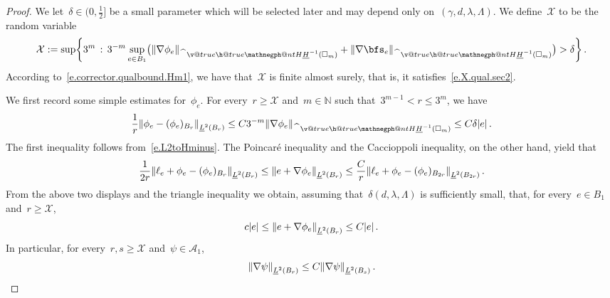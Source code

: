 \documentclass[11pt,twoside]{article} %
\makeatletter
\let\oldsquare\square %
\renewcommand{\square}{\oldsquare}
\numberwithin{equation}{section}
\theoremstyle{definition}
\let\originalleft\left
\let\originalright\right
\renewcommand{\left}{\mathopen{}\mathclose\bgroup\originalleft}
\renewcommand{\right}{\aftergroup\egroup\originalright}
\newcommand*{\N}{\ensuremath{\mathbb{N}}}
\renewcommand*{\hat}{\widehat}
\newcommand{\cu}{\square}
\newcommand{\X}{\mathcal{X}}
\newcommand{\negphantom}{\v@true\h@true\negph@nt}
\newcommand{\negph@nt}{\ifmmode\expandafter\mathpalette 
  \expandafter\mathnegph@nt\else\expandafter\makenegph@nt\fi}
\newcommand{\makenegph@nt}[1]{%
  \setbox\z@\hbox{\color@begingroup#1\color@endgroup}\finnegph@nt}
\newcommand{\finnegph@nt}{%
  \setbox\tw@\null 
  \ifv@ \ht\tw@\ht\z@\dp\tw@\dp\z@\fi \ifh@\wd\tw@-\wd\z@\fi\box\tw@}
\newcommand{\mathnegph@nt}[2]{%
  \setbox\z@\hbox{$\m@th #1{#2}$}\finnegph@nt}
\newcommand{\Hminusul}{\hat{\phantom{H}}\negphantom{H}\underline{H}^{-1}}
\newcommand{\A}{\mathcal{A}}
\makeatother
\begin{document}
\begin{proof}
We let~$\delta\in (0,\tfrac12]$ be a small parameter which will be selected later and may depend only on~$(\gamma,d,\lambda,\Lambda)$. We define~$\X$ to be the random variable
\begin{equation}
\label{e.XC11}
\X:= 
\sup\left\{ 3^m \,:\, 
3^{-m} 
\sup_{e\in B_1}
\bigl(
\left\| \nabla \phi_e \right\|_{\Hminusul(\cu_m)}
+
\left\| \nabla \bfs_e \right\|_{\Hminusul(\cu_m)}
\bigr)
> \delta
\right\}
\,.
\end{equation}
According to~\eqref{e.corrector.qualbound.Hm1}, we have that~$\X$ is finite almost surely, that is, it satisfies~\eqref{e.X.qual.sec2}. 

\smallskip

We first record some simple estimates for~$\phi_e$. 
For every~$r\geq \X$ and~$m \in \N$ such that~$3^{m-1} < r \leq 3^m$, we have 
\begin{align}
\label{e.correbounds.pre}
\frac1r
\left\| \phi_e - (\phi_e)_{B_r} \right\|_{\underline{L}^{2}(B_r)} 
\leq  
C 
3^{-m} \left\| \nabla \phi_e \right\|_{\Hminusul(\cu_m)} 
\leq 
C\delta |e|
\,.
\end{align}
The first inequality follows from~\eqref{e.L2toHminus}. The Poincar\'e inequality and the Caccioppoli inequality, on the other hand, yield that
\begin{align*}  
\frac 1{2r} \left\| \ell_e + \phi_e - (\phi_e)_{B_r} \right\|_{\underline{L}^{2}(B_r)} 
\leq 
\left\| e + \nabla \phi_e \right\|_{\underline{L}^{2}(B_{r})}   
\leq
\frac{C}{r} \left\| \ell_e + \phi_e - (\phi_e)_{B_{2r}} \right\|_{\underline{L}^{2}(B_{2r})} 
\,.
\end{align*}
From the above two displays and the triangle inequality we obtain, assuming that~$\delta(d,\lambda,\Lambda)$ is sufficiently small, that, for every~$e\in B_1$ and~$r\geq \X$, 
\begin{equation}
\label{e.correbounds}
c |e|
\leq
\left\| e + \nabla \phi_e \right\|_{\underline{L}^{2}(B_{r})} 
\leq 
C |e| \,.
\end{equation}
In particular, for every~$r,s\geq \X$ and~$\psi\in \A_1$, 
\begin{equation}
\label{e.correbounds.abc}
\left\| \nabla \psi \right\|_{\underline{L}^{2}(B_{r})} 
\leq 
C \left\| \nabla \psi \right\|_{\underline{L}^{2}(B_{s})}
\,. 
\end{equation}



\smallskip


\end{proof}
\end{document}
